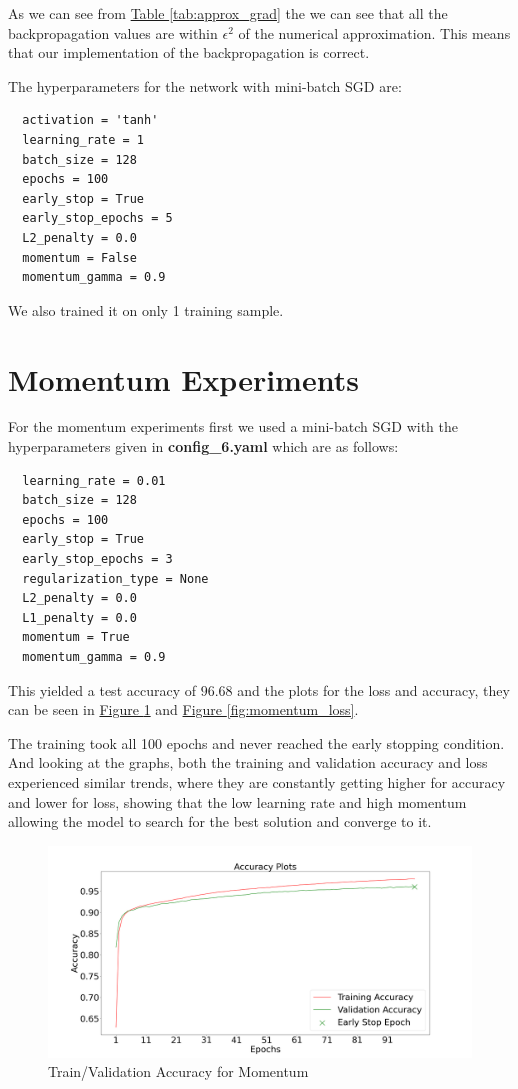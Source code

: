 \documentclass{article}
\begin{document}
As we can see from \hyperref[tab:approx_grad]{Table \ref{tab:approx_grad}} the
we can see that all the backpropagation values are within 
$\epsilon^2$ of the numerical approximation. This means that our
implementation of the backpropagation is correct.

The hyperparameters for the network with mini-batch SGD are:
\begin{verbatim}
  activation = 'tanh'
  learning_rate = 1
  batch_size = 128
  epochs = 100
  early_stop = True
  early_stop_epochs = 5
  L2_penalty = 0.0
  momentum = False
  momentum_gamma = 0.9
\end{verbatim}

We also trained it on only 1 training sample.


\section{Momentum Experiments}
For the momentum experiments first we used a mini-batch SGD with the hyperparameters
given in \textbf{config\_6.yaml} which are as follows:
\begin{verbatim}
  learning_rate = 0.01
  batch_size = 128
  epochs = 100
  early_stop = True
  early_stop_epochs = 3
  regularization_type = None
  L2_penalty = 0.0
  L1_penalty = 0.0
  momentum = True
  momentum_gamma = 0.9
\end{verbatim}

This yielded a test accuracy of $96.68$ and the plots for the 
loss and accuracy, they can be seen in 
\hyperref[fig:momentum_acc]{Figure \ref{fig:momentum_acc}} and
\hyperref[fig:momentum_loss]{Figure \ref{fig:momentum_loss}}.

The training took all 100 epochs and never reached the early stopping
condition. And looking at the graphs, both the training and validation
accuracy and loss experienced similar trends, where they are constantly
getting higher for accuracy and lower for loss, showing that the 
low learning rate and high momentum allowing the model to 
search for the best solution and converge to it.

\begin{figure}[h]
  \centering
  \includegraphics[width=0.8\linewidth]{include/momentum-experiments-acc.png}
  \caption{Train/Validation Accuracy for Momentum}
  \label{fig:momentum_acc}
\end{figure}
\end{document}

